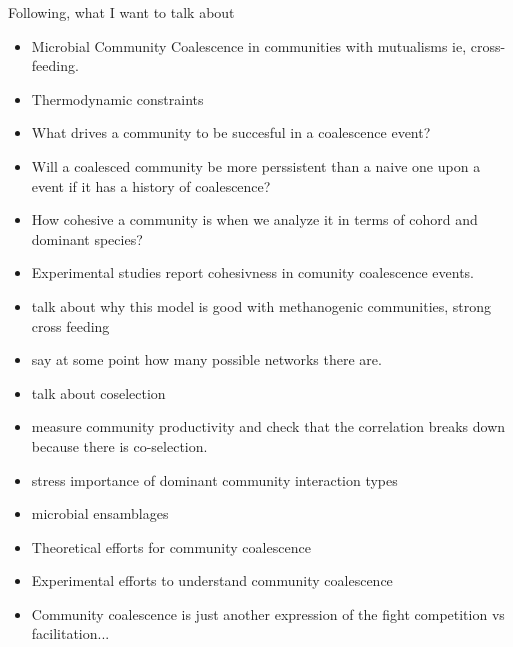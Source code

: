 \documentclass[titlepage,11pt]{article}
\begin{document}
\begin{linenumbers}
\begin{itemize}
			\end{itemize}
			Following, what I want to talk about
			\begin{itemize}
				\item Microbial Community Coalescence in communities with mutualisms ie, cross-feeding.
				\item Thermodynamic constraints
				\item What drives a community to be succesful in a coalescence event?
				\item Will a coalesced community be more perssistent than a naive one upon a  event if it has a history of coalescence?
				\item How cohesive a community is when we analyze it in terms of cohord and dominant species? 
				\item Experimental studies report cohesivness in comunity coalescence events.
				\item talk about why this model is good with methanogenic communities, strong cross feeding
				\item say at some point how many possible networks there are.
				\item talk about coselection
				\item measure community productivity and check that the correlation breaks down because there is co-selection.
				\item stress importance of dominant community interaction types
				\item microbial ensamblages
				\item Theoretical efforts for community coalescence \citep{Tikhonov2016, Livingston2013, Toquenaga1997, Gilpin1994}
				\item Experimental efforts to understand community coalescence \citep{Lu2018, Sierocinski2017}
				\item Community coalescence is just another expression of the fight competition vs facilitation...
				
			\end{itemize}
		\newpage

\end{linenumbers}
\end{document}
